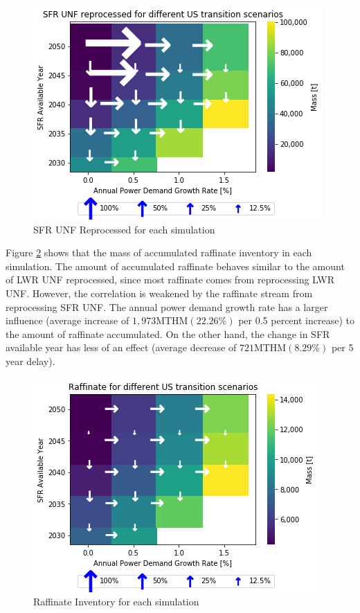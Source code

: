 \begin{figure}[htbp!]
    \begin{center}
        \includegraphics[scale=0.7]{./images/us/scat_both_SFR_UNF_reprocessed.png}
    \end{center}
        \caption{\gls{SFR} \gls{UNF} Reprocessed for each simulation}
    \label{fig:us_sfr_unf_rep}
\end{figure}



Figure \ref{fig:us_raff} shows that the mass of accumulated
raffinate inventory in each simulation. 
The amount of accumulated raffinate behaves similar to the
amount of \gls{LWR} \gls{UNF} reprocessed, since most 
raffinate comes from reprocessing \gls{LWR} \gls{UNF}. However, the correlation is weakened by the raffinate stream from reprocessing \gls{SFR} \gls{UNF}. The annual power demand
growth rate has a larger influence (average increase of $1,973 \text{MTHM} (22.26 \%)$ 
per 0.5 percent increase) to the amount of raffinate accumulated. On the other hand, the change in  \gls{SFR} available year
has less of an effect (average decrease of $721 \text{MTHM} (8.29\%)$
per 5 year delay).


\begin{figure}[htbp!]
    \begin{center}
        \includegraphics[scale=0.7]{./images/us/scat_both_Raffinate.png}
    \end{center}
        \caption{Raffinate Inventory for each simulation}
    \label{fig:us_raff}
\end{figure}

